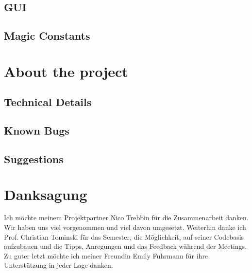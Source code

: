 \documentclass[final,nopreprintline]{elsarticle}
\begin{document}
\subsection{GUI}
\label{subsec:gui}
    

\subsection{Magic Constants}
\label{subsec:consts}
    


\section{About the project}
\label{sec:about}

\subsection{Technical Details}
\label{subsec:technical}
    

\subsection{Known Bugs}
\label{subsec:bugs}
    

\subsection{Suggestions}
\label{subsec:suggest}
    

\section*{Danksagung}
Ich möchte meinem Projektpartner Nico Trebbin für die Zusammenarbeit danken. Wir haben uns viel vorgenommen und viel davon umgesetzt.
Weiterhin danke ich Prof. Christian Tominski für das Semester, die Möglichkeit, auf seiner Codebasis aufzubauen und die Tipps, Anregungen und das Feedback während der Meetings.
Zu guter letzt möchte ich meiner Freundin Emily Fuhrmann für ihre Unterstützung in jeder Lage danken.

 


%
\end{document}
